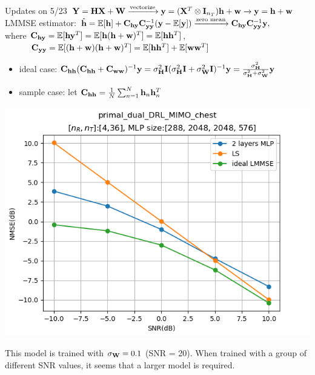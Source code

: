 \documentclass[hyperref={bookmarks=false}]{beamer}
\numberwithin{figure}{section}
\begin{document}
\begin{frame}[allowframebreaks]{Updates on 5/23}
${\bf Y}={\bf H}{\bf X}+{\bf W} \xrightarrow{\text{vectorize}} {\bf y}=({\bf X}^T\otimes{\bf I}_{n_T}){\bf h}+{\bf w} \xrightarrow{} {\bf y}={\bf h}+{\bf w}$ \\

LMMSE estimator: $\hat{{\bf h}} = \mathbb{E}[{\bf h}]+{\bf C}_{{\bf h}{\bf y}}{\bf C}^{-1}_{{\bf y}{\bf y}}({\bf y}-\mathbb{E}[{\bf y}])
\xrightarrow{\text{zero mean}}  {\bf C}_{{\bf h}{\bf y}}{\bf C}^{-1}_{{\bf y}{\bf y}}{\bf y},$\\
where ${\bf C}_{{\bf h}{\bf y}} = \mathbb{E}[{\bf h}{\bf y}^T] = \mathbb{E}[{\bf h}({\bf h}+{\bf w})^T] = \mathbb{E}[{\bf h}{\bf h}^T]$,\\
$\quad \quad \quad {\bf C}_{{\bf y}{\bf y}} = \mathbb{E}[({\bf h}+{\bf w})({\bf h}+{\bf w})^T] = \mathbb{E}[{\bf h}{\bf h}^T] + \mathbb{E}[{\bf w}{\bf w}^T]$
\begin{itemize}
  \item ideal case: ${\bf C}_{{\bf h}{\bf h}}({\bf C}_{{\bf h}{\bf h}}+{\bf C}_{{\bf w}{\bf w}})^{-1}{\bf y} = 
      \sigma_{{\bf H}}^2{\bf I}(\sigma_{{\bf H}}^2{\bf I} + \sigma_{{\bf W}}^2{\bf I})^{-1}{\bf y} = 
      \frac{\sigma_{{\bf H}}^2}{\sigma_{{\bf H}}^2+\sigma_{{\bf W}}^2}{\bf y}$
  \item sample case: let ${\bf C}_{{\bf h}{\bf h}} = \frac{1}{N}\sum_{n=1}^{N}{\bf h}_n{\bf h}_n^T$
\end{itemize}
\begin{center}
  \includegraphics[width=0.7\linewidth]{figures/240523/mlp[2048,2048]_snr[-10.0,10.0]_4est_n.png}
\end{center}
This model is trained with $\sigma_{{\bf W}} = 0.1$ (SNR = 20). When trained with a group of different 
SNR values, 
it seems that a larger model is required.
\end{frame}
\end{document}

